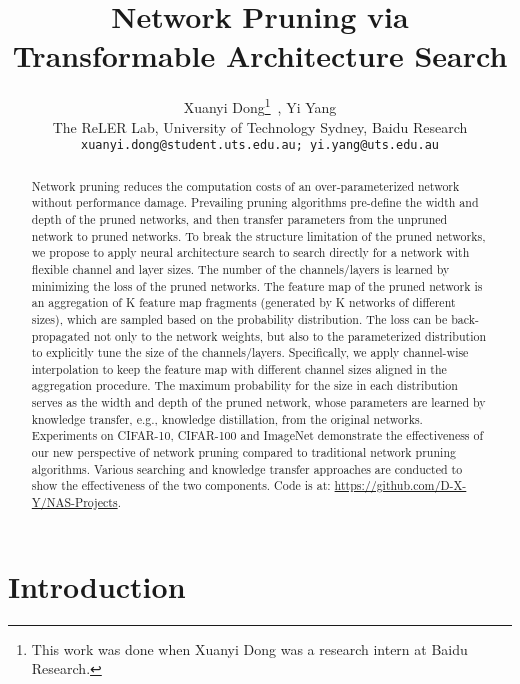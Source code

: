 \documentclass{article}
\title{Network Pruning via\\Transformable Architecture Search}
\author{
  Xuanyi Dong\thanks{This work was done when Xuanyi Dong was a research intern at Baidu Research.}~, Yi Yang \\
  The ReLER Lab, University of Technology Sydney, Baidu Research\\
  \texttt{xuanyi.dong@student.uts.edu.au; yi.yang@uts.edu.au}
}
\begin{document}
\maketitle

\begin{abstract}
Network pruning reduces the computation costs of an over-parameterized network without performance damage. 
Prevailing pruning algorithms pre-define the width and depth of the pruned networks, and then transfer parameters from the unpruned network to pruned networks.
To break the structure limitation of the pruned networks, we propose to apply neural architecture search to search directly for a network with flexible channel and layer sizes.
The number of the channels/layers is learned by minimizing the loss of the pruned networks.
The feature map of the pruned network is an aggregation of K feature map fragments (generated by K networks of different sizes), which are sampled based on the probability distribution.
The loss can be back-propagated not only to the network weights, but also to the parameterized distribution to explicitly tune the size of the channels/layers.
Specifically, we apply channel-wise interpolation to keep the feature map with different channel sizes aligned in the aggregation procedure.
The maximum probability for the size in each distribution serves as the width and depth of the pruned network, whose parameters are learned by knowledge transfer, e.g., knowledge distillation, from the original networks.
Experiments on CIFAR-10, CIFAR-100 and ImageNet demonstrate the effectiveness of our new perspective of network pruning compared to traditional network pruning algorithms.
Various searching and knowledge transfer approaches are conducted to show the effectiveness of the two components.
Code is at: \url{https://github.com/D-X-Y/NAS-Projects}.
\end{abstract}





\section{Introduction}\label{sec:intro}
\end{document}

